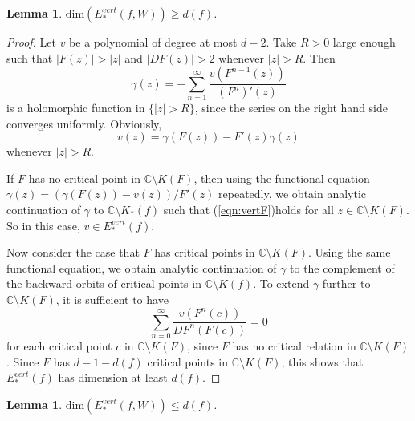 \documentclass{amsart}
\numberwithin{equation}{section}
\newtheorem{lemma}[theorem]{Lemma}%
\newcommand{\C}{\mathbb C}
\theoremstyle{definition}
\theoremstyle{remark}
\begin{document}
\begin{lemma} $\text{dim}(E^{vert}_*(f,W))\ge d(f)$.
\end{lemma}
\begin{proof}
Let $v$ be a polynomial of degree at most $d-2$. Take $R>0$ large enough such that $|F(z)|>|z|$ and $|DF(z)|>2$ whenever $|z|>R$. Then 
$$\gamma(z)=-\sum_{n=1}^\infty \frac{v(F^{n-1}(z))}{(F^{n})'(z)}$$
is a holomorphic function in $\{|z|>R\}$, since the series on the right hand side converges uniformly. Obviously, 
\begin{equation}\label{eqn:vertF}
v(z)=\gamma(F(z))-F'(z)\gamma(z)
\end{equation}
whenever $|z|>R$. 

If $F$ has no critical point in $\mathbb{C}\setminus K(F)$, then using the functional equation $\gamma(z)=(\gamma(F(z))-v(z))/F'(z)$ repeatedly, we obtain analytic continuation of $\gamma$ to $\mathbb{C}\setminus K_*(f)$ such that (\ref{eqn:vertF})holds for all $z\in \C\setminus K(F)$. So in this case, $v\in E^{vert}_*(f)$.

Now consider the case that $F$ has critical points in $\mathbb{C}\setminus K(F)$. Using the same functional equation, we obtain analytic continuation of $\gamma$  to the complement of the backward orbits of critical points in $\mathbb{C}\setminus K(f)$. To extend $\gamma$ further to $\mathbb{C}\setminus K(F)$, it is sufficient to have 
$$\sum_{n=0}^\infty \frac{v(F^n(c))}{DF^n(F(c))}=0$$
for each critical point $c$ in $\mathbb{C}\setminus K(F)$, since $F$ has no critical relation in $\C\setminus K(F)$.
Since $F$ has $d-1-d(f)$ critical points in $\mathbb{C}\setminus K(F)$,
this shows that $E^{vert}_*(f)$ has dimension at least $d(f)$.
\end{proof}
\begin{lemma}
$\text{dim}(E^{vert}_*(f, W))\le d(f)$. 
\end{lemma}
\end{document}
